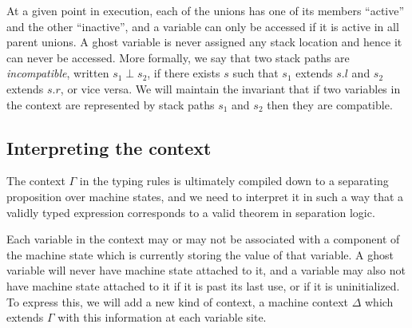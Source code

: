 \documentclass[acmsmall,nonacm]{acmart}
\begin{document}
At a given point in execution, each of the unions has one of its members ``active'' and the other ``inactive'', and a variable can only be accessed if it is active in all parent unions.
A ghost variable is never assigned any stack location and hence it can never be accessed. More formally, we say that two stack paths are \emph{incompatible}, written $s_1\perp s_2$, if there exists $s$ such that $s_1$ extends $s.l$ and $s_2$ extends $s.r$, or vice versa. We will maintain the invariant that if two variables in the context are represented by stack paths $s_1$ and $s_2$ then they are compatible.

\subsection{Interpreting the context}

The context $\Gamma$ in the typing rules is ultimately compiled down to a separating proposition over machine states, and we need to interpret it in such a way that a validly typed expression corresponds to a valid theorem in separation logic.

Each variable in the context may or may not be associated with a component of the machine state which is currently storing the value of that variable. A ghost variable will never have machine state attached to it, and a variable may also not have machine state attached to it if it is past its last use, or if it is uninitialized. To express this, we will add a new kind of context, a machine context $\Delta$ which extends $\Gamma$ with this information at each variable site.
\end{document}
